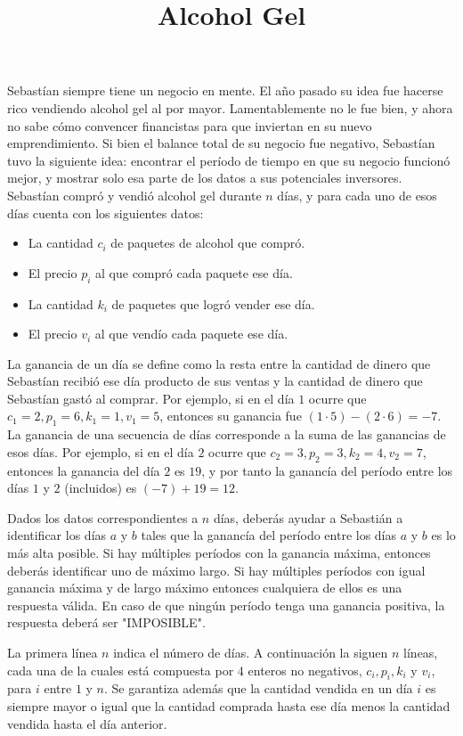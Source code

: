 \documentclass{oci}
\title{Alcohol Gel}
\begin{document}
\begin{problemDescription}
Sebastían siempre tiene un negocio en mente. El año pasado su idea fue hacerse rico vendiendo alcohol gel al por mayor. Lamentablemente no le fue bien, y ahora no sabe cómo convencer financistas para que inviertan en su nuevo emprendimiento.
 Si bien el balance total de su negocio fue negativo, Sebastían tuvo la siguiente idea: encontrar el período de tiempo en que su negocio funcionó mejor, y mostrar solo esa parte de los datos a sus potenciales inversores. 
Sebastían compró y vendió alcohol gel durante $n$ días, y para cada uno de esos días cuenta con los siguientes datos:
\begin{itemize}
	\item La cantidad $c_i$ de paquetes de alcohol que compró. 
	\item El precio $p_i$ al que compró cada paquete ese día.
	\item La cantidad $k_i$ de paquetes que logró vender ese día.
	\item El precio $v_i$ al que vendío cada paquete ese día.
\end{itemize}

La ganancia de un día se define como la resta entre la cantidad de dinero que Sebastían recibió ese día producto de sus ventas y la cantidad de dinero que Sebastían gastó al comprar. Por ejemplo, si en el día $1$ ocurre que $c_1 = 2, p_1 = 6, k_1=1, v_1=5$, entonces su ganancia fue $(1 \cdot 5) - (2 \cdot 6) = -7$.
 La ganancia de una secuencia de días corresponde a la suma de las ganancias de esos días. Por ejemplo, si en el día $2$ ocurre que $c_2 = 3, p_2 = 3, k_2=4, v_2=7$, entonces la ganancia del día $2$ es $19$, y por tanto la ganancía del período entre los días $1$ y $2$ (incluidos) es $(-7) + 19 = 12$.

Dados los datos correspondientes a $n$ días, deberás ayudar a Sebastián a identificar los días $a$ y $b$ tales que la ganancía del período entre los días $a$ y $b$ es lo más alta posible. Si hay múltiples períodos con la ganancia máxima, entonces deberás identificar uno de máximo largo. Si hay múltiples períodos con igual ganancia máxima y de largo máximo entonces cualquiera de ellos es una respuesta válida. En caso de que ningún período tenga una ganancia positiva, la respuesta deberá ser "IMPOSIBLE".

\end{problemDescription}

\begin{inputDescription}
La primera línea $n$ indica el número de días. A continuación la siguen $n$ líneas, cada una de la cuales está compuesta por $4$ enteros no negativos, $c_i, p_i, k_i$ y $v_i$, para $i$ entre $1$ y $n$. Se garantiza además que la cantidad vendida en un día $i$ 
es siempre mayor o igual que la cantidad comprada hasta ese día menos la cantidad vendida hasta el día anterior.
\end{inputDescription}
\end{document}
